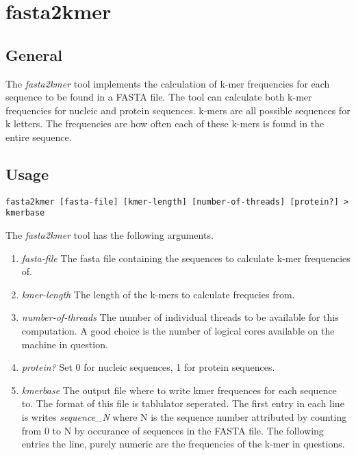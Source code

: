 \section{fasta2kmer} \label{sec-fasta2kmer}

\subsection{General}

The \emph{fasta2kmer} tool implements the calculation of k-mer
frequencies for each sequence to be found in a FASTA \cite{fasta}
file. The tool can calculate both k-mer frequencies for nucleic and
protein sequences. k-mers are all possible sequences for k
letters. The frequencies are how often each of these k-mers is found
in the entire sequence.

\subsection{Usage}

\begin{lstlisting}
fasta2kmer [fasta-file] [kmer-length] [number-of-threads] [protein?] > kmerbase
\end{lstlisting}
The \emph{fasta2kmer} tool has the following arguments.
\begin{enumerate}
  \item \emph{fasta-file} The fasta file containing the sequences to
    calculate k-mer frequencies of.
  \item \emph{kmer-length} The length of the k-mers to calculate
    frequcies from.
  \item \emph{number-of-threads} The number of individual threads to
    be available for this computation. A good choice is the number of
    logical cores available on the machine in question.
  \item \emph{protein?} Set 0 for nucleic sequences, 1 for protein
    sequences.
  \item \emph{kmerbase} The output file where to write kmer frequences
    for each sequence to. The format of this file is tablulator
    seperated. The first entry in each line is writes
    \emph{sequence\_N} where N is the sequence number attributed by
    counting from 0 to N by occurance of sequences in the FASTA
    file. The following entries the line, purely numeric are the
    frequencies of the k-mer in questions.
\end{enumerate}

